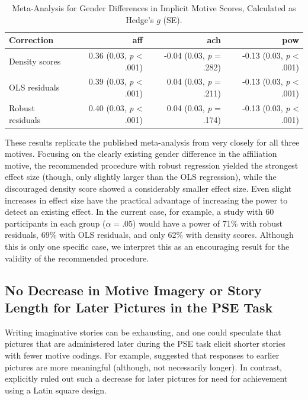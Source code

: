 \documentclass[man,a4paper,mask]{apa6}\usepackage[]{graphicx}\usepackage[]{color}
\begin{document}
\begin{table}
		\caption{Meta-Analysis for Gender Differences in Implicit Motive Scores, Calculated as Hedge's $g$ (SE).}
		\label{tab:MA}
		\footnotesize
		\begin{tabularx}{\textwidth}{lrrr}
		\toprule

Correction & aff & ach & pow \\ 
  \hline
Density scores & 0.36 (0.03, \emph{p} < .001) & -0.04 (0.03, \emph{p} = .282) & -0.13 (0.03, \emph{p} < .001) \\ 
  OLS residuals & 0.39 (0.03, \emph{p} < .001) & 0.04 (0.03, \emph{p} = .211) & -0.13 (0.03, \emph{p} < .001) \\ 
  Robust residuals & 0.40 (0.03, \emph{p} < .001) & 0.04 (0.03, \emph{p} = .174) & -0.13 (0.03, \emph{p} < .001) \\ 
   \hline

		\bottomrule
		\end{tabularx}
\end{table}



These results replicate the published meta-analysis from \textcite{drescher_MetaanalyticEvidenceHigher_2016} very closely for all three motives. Focusing on the clearly existing gender difference in the affiliation motive, the recommended procedure with robust regression yielded the strongest effect size (though, only slightly larger than the OLS regression), while the discouraged density score showed a considerably smaller effect size. Even slight increases in effect size have the practical advantage of increasing the power to detect an existing effect. In the current case, for example, a study with 60 participants in each group ($\alpha = .05$) would have a power of 71\% with robust residuals, 69\% with OLS residuals, and only 62\% with density scores. 
Although this is only one specific case, we interpret this as an encouraging result for the validity of the recommended procedure.

\subsection{No Decrease in Motive Imagery or Story Length for Later Pictures in the PSE Task}
Writing imaginative stories can be exhausting, and one could speculate that pictures that are administered later during the PSE task elicit shorter stories with fewer motive codings. For example, \textcite{smith_MethodologicalConsiderationsSteps_1992} suggested that responses to earlier pictures are more meaningful (although, not necessarily longer). In contrast, \textcite[][Table 7.1]{mcclelland_achievement_1953} explicitly ruled out such a decrease for later pictures for need for achievement using a Latin square design.
\end{document}
